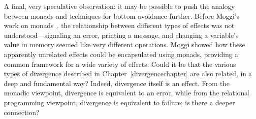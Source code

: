 %
%
%

A final, very speculative observation: it may be possible to push the
analogy between monads and techniques for bottom avoidance further.
Before Moggi's work on monads~\cite{moggi91notions}, the relationship
between different types of effects was not understood---signaling an
error, printing a message, and changing a variable's value in memory
seemed like very different operations.  Moggi showed how these
apparently unrelated effects could be encapsulated using monads,
providing a common framework for a wide variety of effects.  Could it
be that the various types of divergence described in
Chapter~\ref{divergencechapter} are also related, in a deep and
fundamental way?  Indeed, divergence itself is an effect.  From the
monadic viewpoint, divergence is equivalent to an error, while from
the relational programming viewpoint, divergence is equivalent to
failure; is there a deeper connection?


